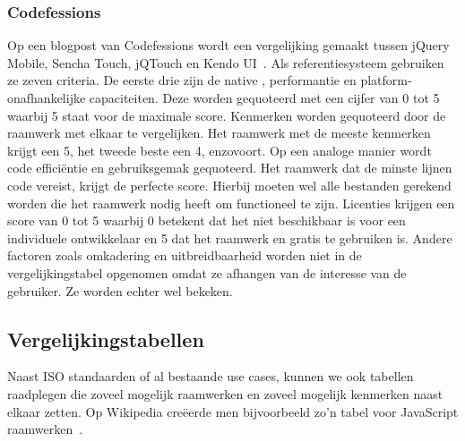 \subsubsection{Codefessions}
Op een blogpost van Codefessions wordt een vergelijking gemaakt tussen jQuery Mobile, Sencha Touch, jQTouch en Kendo UI~\cite{Sarrafi2012}.  Als referentiesysteem gebruiken ze zeven criteria.  De eerste drie zijn de native , performantie en platform-onafhankelijke capaciteiten.  Deze worden gequoteerd met een cijfer van 0 tot 5 waarbij 5 staat voor de maximale score. Kenmerken worden gequoteerd door de raamwerk met elkaar te vergelijken.  Het raamwerk met de meeste kenmerken krijgt een 5, het tweede beste een 4, enzovoort.  Op een analoge manier wordt code efficiëntie en gebruiksgemak gequoteerd.  Het raamwerk dat de minste lijnen code vereist, krijgt de perfecte score. Hierbij moeten wel alle bestanden gerekend worden die het raamwerk nodig heeft om functioneel te zijn. Licenties krijgen een score van 0 tot 5 waarbij 0 betekent dat het niet beschikbaar is voor een individuele ontwikkelaar en 5 dat het raamwerk  en gratis te gebruiken is. Andere factoren zoals omkadering en uitbreidbaarheid worden niet in de vergelijkingstabel opgenomen omdat ze afhangen van de interesse van de gebruiker.  Ze worden echter wel bekeken.


\subsection{Vergelijkingstabellen}
Naast ISO standaarden of al bestaande use cases, kunnen we ook tabellen raadplegen die zoveel mogelijk raamwerken en zoveel mogelijk kenmerken naast elkaar zetten.  Op Wikipedia creëerde men bijvoorbeeld zo'n tabel voor JavaScript raamwerken~\cite{Wikipedia}.  

